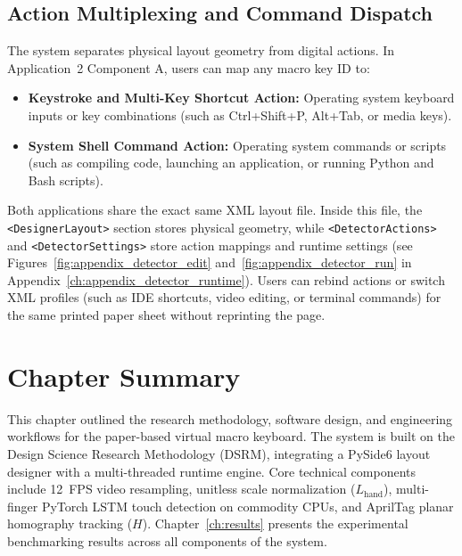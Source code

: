 \subsection{Action Multiplexing and Command Dispatch}
\label{subsec:meth_action_multiplexing}
The system separates physical layout geometry from digital actions. In Application~2 Component A, users can map any macro key ID to:
\begin{itemize}
    \item \textbf{Keystroke and Multi-Key Shortcut Action:} Operating system keyboard inputs or key combinations (such as Ctrl+Shift+P, Alt+Tab, or media keys).
    \item \textbf{System Shell Command Action:} Operating system commands or scripts (such as compiling code, launching an application, or running Python and Bash scripts).
\end{itemize}

Both applications share the exact same XML layout file. Inside this file, the \texttt{<DesignerLayout>} section stores physical geometry, while \texttt{<DetectorActions>} and \texttt{<DetectorSettings>} store action mappings and runtime settings (see Figures~\ref{fig:appendix_detector_edit} and~\ref{fig:appendix_detector_run} in Appendix~\ref{ch:appendix_detector_runtime}). Users can rebind actions or switch XML profiles (such as IDE shortcuts, video editing, or terminal commands) for the same printed paper sheet without reprinting the page.

\section{Chapter Summary}
\label{sec:meth_summary}
This chapter outlined the research methodology, software design, and engineering workflows for the paper-based virtual macro keyboard. The system is built on the Design Science Research Methodology (DSRM), integrating a PySide6 layout designer with a multi-threaded runtime engine. Core technical components include 12~FPS video resampling, unitless scale normalization ($L_{\text{hand}}$), multi-finger PyTorch LSTM touch detection on commodity CPUs, and AprilTag planar homography tracking ($H$). Chapter~\ref{ch:results} presents the experimental benchmarking results across all components of the system.

